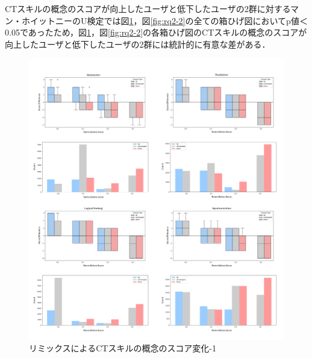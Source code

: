 \documentclass[11pt]{jreport}
\begin{document}
CTスキルの概念のスコアが向上したユーザと低下したユーザの2群に対するマン・ホイットニーのU検定では図\ref{fig:rq2-1}，図\ref{fig:rq2-2}の全ての箱ひげ図においてp値＜0.05であったため，図\ref{fig:rq2-1}，図\ref{fig:rq2-2}の各箱ひげ図のCTスキルの概念のスコアが向上したユーザと低下したユーザの2群には統計的に有意な差がある．


\begin{figure}[h]
\centerline{\includegraphics[width=1.2\linewidth]{@BSthesis2024_Horio/BSthesis2024_Horio_fig/rq2-1.pdf}}
\caption{リミックスによるCTスキルの概念のスコア変化-1}
\label{fig:rq2-1}
\end{figure}
\end{document}
